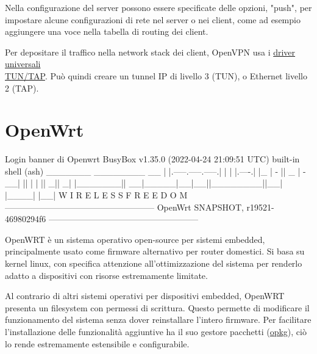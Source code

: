 Nella configurazione del server possono essere specificate delle opzioni, "push", per impostare alcune configurazioni di rete nel server o nei client, come ad esempio aggiungere una voce nella tabella di routing dei client.



Per depositare il traffico nella network stack dei client, OpenVPN usa i \href{https://docs.kernel.org/networking/tuntap.html}{driver universali \\TUN/TAP}. Può quindi creare un tunnel IP di livello 3 (TUN), o Ethernet livello 2 (TAP).


\section{OpenWrt}

\begin{bashcode}{Login banner di Openwrt}{}
BusyBox v1.35.0 (2022-04-24 21:09:51 UTC) built-in shell (ash)
_______                     ________        __
|       |.-----.-----.-----.|  |  |  |.----.|  |_
|   -   ||  _  |  -__|     ||  |  |  ||   _||   _|
|_______||   __|_____|__|__||________||__|  |____|
|__| W I R E L E S S   F R E E D O M
-----------------------------------------------------
OpenWrt SNAPSHOT, r19521-46980294f6
-----------------------------------------------------
\end{bashcode}

OpenWRT è un sistema operativo open-source per sistemi embedded, principalmente usato come firmware alternativo per router domestici. Si basa su kernel linux, con specifica attenzione all'ottimizzazione del sistema per renderlo adatto a dispositivi con risorse estremamente limitate.

Al contrario di altri sistemi operativi per dispositivi embedded, OpenWRT presenta un filesystem con permessi di scrittura. Questo permette di modificare il funzionamento del sistema senza dover reinstallare l'intero firmware. Per facilitare l'installazione delle funzionalità aggiuntive ha il suo gestore pacchetti (\href{https://openwrt.org/docs/guide-user/additional-software/opkg}{opkg}), ciò lo rende estremamente estensibile e configurabile.

